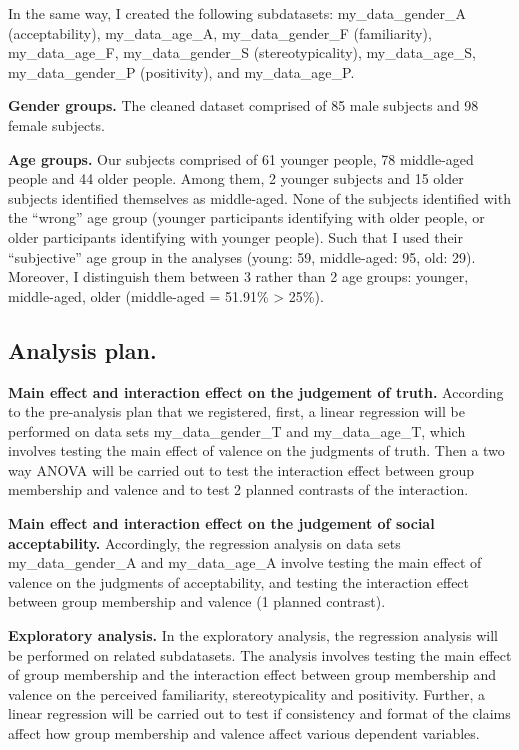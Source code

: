 \documentclass[man]{apa6}
\begin{document}
In the same way, I created the following subdatasets:
my\_data\_gender\_A (acceptability), my\_data\_age\_A,
my\_data\_gender\_F (familiarity), my\_data\_age\_F, my\_data\_gender\_S
(stereotypicality), my\_data\_age\_S, my\_data\_gender\_P (positivity),
and my\_data\_age\_P.

\textbf{Gender groups.} The cleaned dataset comprised of 85 male
subjects and 98 female subjects.

\textbf{Age groups.} Our subjects comprised of 61 younger people, 78
middle-aged people and 44 older people. Among them, 2 younger subjects
and 15 older subjects identified themselves as middle-aged. None of the
subjects identified with the \enquote{wrong} age group (younger
participants identifying with older people, or older participants
identifying with younger people). Such that I used their
\enquote{subjective} age group in the analyses (young: 59, middle-aged:
95, old: 29). Moreover, I distinguish them between 3 rather than 2 age
groups: younger, middle-aged, older (middle-aged = 51.91\%
\textgreater{} 25\%).

\subsection{\texorpdfstring{\textbf{Analysis
plan.}}{Analysis plan.}}\label{analysis-plan.}

\textbf{Main effect and interaction effect on the judgement of truth.}
According to the pre-analysis plan that we registered, first, a linear
regression will be performed on data sets my\_data\_gender\_T and
my\_data\_age\_T, which involves testing the main effect of valence on
the judgments of truth. Then a two way ANOVA will be carried out to test
the interaction effect between group membership and valence and to test
2 planned contrasts of the interaction.

\textbf{Main effect and interaction effect on the judgement of social
acceptability.} Accordingly, the regression analysis on data sets
my\_data\_gender\_A and my\_data\_age\_A involve testing the main effect
of valence on the judgments of acceptability, and testing the
interaction effect between group membership and valence (1 planned
contrast).

\textbf{Exploratory analysis.} In the exploratory analysis, the
regression analysis will be performed on related subdatasets. The
analysis involves testing the main effect of group membership and the
interaction effect between group membership and valence on the perceived
familiarity, stereotypicality and positivity. Further, a linear
regression will be carried out to test if consistency and format of the
claims affect how group membership and valence affect various dependent
variables.
\end{document}
